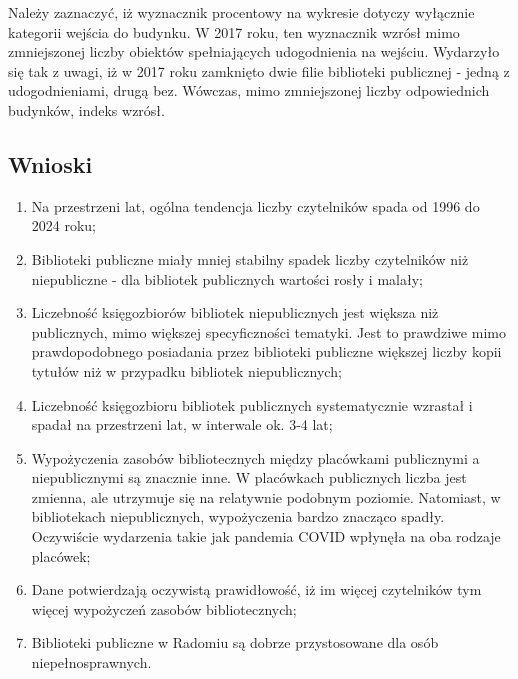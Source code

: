 \documentclass[12pt]{article}
\begin{document}
Należy zaznaczyć, iż wyznacznik procentowy na wykresie dotyczy wyłącznie kategorii wejścia do budynku. W 2017 roku, ten wyznacznik wzrósł mimo zmniejszonej liczby obiektów 
spełniających udogodnienia na wejściu. Wydarzyło się tak z uwagi, iż w 2017 roku zamknięto dwie filie biblioteki publicznej - jedną z udogodnieniami, drugą bez. Wówczas, 
mimo zmniejszonej liczby odpowiednich budynków, indeks wzrósł.



\newpage
\subsection{Wnioski}
\begin{enumerate}
    \item Na przestrzeni lat, ogólna tendencja liczby czytelników spada od 1996 do 2024 roku;
    \item Biblioteki publiczne miały mniej stabilny spadek liczby czytelników niż niepubliczne - dla bibliotek publicznych wartości 
            rosły i malały;
    \item Liczebność księgozbiorów bibliotek niepublicznych jest większa niż publicznych, mimo większej specyficzności tematyki. 
            Jest to prawdziwe mimo prawdopodobnego posiadania przez biblioteki publiczne większej liczby kopii tytułów niż 
            w przypadku bibliotek niepublicznych;
    \item Liczebność księgozbioru bibliotek publicznych systematycznie wzrastał i spadał na przestrzeni lat, w interwale 
            ok. 3-4 lat;
    \item Wypożyczenia zasobów bibliotecznych między placówkami publicznymi a niepublicznymi są znacznie inne. W placówkach publicznych 
            liczba jest zmienna, ale utrzymuje się na relatywnie podobnym poziomie. Natomiast, w bibliotekach niepublicznych, 
            wypożyczenia bardzo znacząco spadły. Oczywiście wydarzenia takie jak pandemia COVID wpłynęła na oba rodzaje placówek;
    \item Dane potwierdzają oczywistą prawidłowość, iż im więcej czytelników tym więcej wypożyczeń zasobów bibliotecznych;
    \item Biblioteki publiczne w Radomiu są dobrze przystosowane dla osób niepełnosprawnych.
\end{enumerate}
\end{document}
